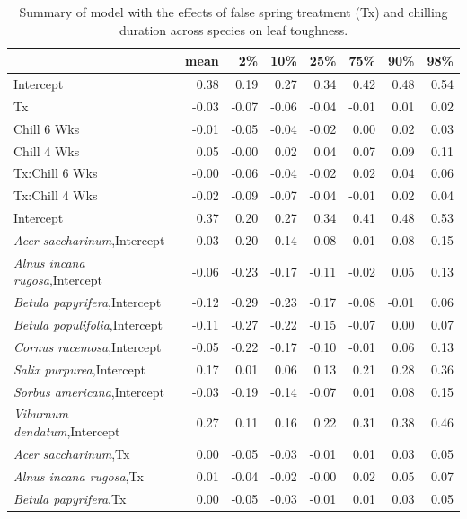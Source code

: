 \documentclass{article}\usepackage[]{graphicx}\usepackage[]{color}
\begin{document}
  
\newpage
\begin{longtable}{lrrrrrrr}
\caption{Summary of model with the effects of false spring treatment (Tx) and chilling duration across species on leaf toughness.} \\ 
  \hline
 & mean & 2\% & 10\% & 25\% & 75\% & 90\% & 98\% \\ 
  \hline \endhead  \hline
Intercept & 0.38 & 0.19 & 0.27 & 0.34 & 0.42 & 0.48 & 0.54 \\ 
  Tx & -0.03 & -0.07 & -0.06 & -0.04 & -0.01 & 0.01 & 0.02 \\ 
  Chill 6 Wks & -0.01 & -0.05 & -0.04 & -0.02 & 0.00 & 0.02 & 0.03 \\ 
  Chill 4 Wks & 0.05 & -0.00 & 0.02 & 0.04 & 0.07 & 0.09 & 0.11 \\ 
  Tx:Chill 6 Wks & -0.00 & -0.06 & -0.04 & -0.02 & 0.02 & 0.04 & 0.06 \\ 
  Tx:Chill 4 Wks & -0.02 & -0.09 & -0.07 & -0.04 & -0.01 & 0.02 & 0.04 \\ 
  Intercept & 0.37 & 0.20 & 0.27 & 0.34 & 0.41 & 0.48 & 0.53 \\ 
  \textit{Acer saccharinum},Intercept & -0.03 & -0.20 & -0.14 & -0.08 & 0.01 & 0.08 & 0.15 \\ 
  \textit{Alnus incana rugosa},Intercept & -0.06 & -0.23 & -0.17 & -0.11 & -0.02 & 0.05 & 0.13 \\ 
  \textit{Betula papyrifera},Intercept & -0.12 & -0.29 & -0.23 & -0.17 & -0.08 & -0.01 & 0.06 \\ 
  \textit{Betula populifolia},Intercept & -0.11 & -0.27 & -0.22 & -0.15 & -0.07 & 0.00 & 0.07 \\ 
  \textit{Cornus racemosa},Intercept & -0.05 & -0.22 & -0.17 & -0.10 & -0.01 & 0.06 & 0.13 \\ 
  \textit{Salix purpurea},Intercept & 0.17 & 0.01 & 0.06 & 0.13 & 0.21 & 0.28 & 0.36 \\ 
  \textit{Sorbus americana},Intercept & -0.03 & -0.19 & -0.14 & -0.07 & 0.01 & 0.08 & 0.15 \\ 
  \textit{Viburnum dendatum},Intercept & 0.27 & 0.11 & 0.16 & 0.22 & 0.31 & 0.38 & 0.46 \\ 
  \textit{Acer saccharinum},Tx & 0.00 & -0.05 & -0.03 & -0.01 & 0.01 & 0.03 & 0.05 \\ 
  \textit{Alnus incana rugosa},Tx & 0.01 & -0.04 & -0.02 & -0.00 & 0.02 & 0.05 & 0.07 \\ 
  \textit{Betula papyrifera},Tx & 0.00 & -0.05 & -0.03 & -0.01 & 0.01 & 0.03 & 0.05 \\ 

\end{longtable}
\end{document}

